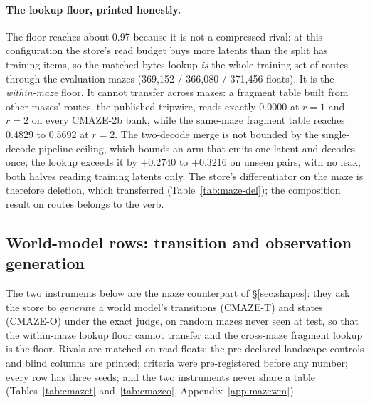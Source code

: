 \documentclass{article} %
\begin{document}
\paragraph{The lookup floor, printed honestly.} The floor reaches about 0.97 because it is not a
compressed rival: at this configuration the store's read budget buys more latents than the split
has training items, so the matched-bytes lookup \emph{is} the whole training set of routes
through the evaluation mazes (369,152 / 366,080 / 371,456 floats). %
It is the \emph{within-maze} floor. It cannot transfer across mazes: a fragment table built from
other mazes' routes, the published tripwire, reads exactly 0.0000 at $r=1$ and $r=2$ on every
CMAZE-2b bank, while the same-maze fragment table reaches 0.4829 to 0.5692 at $r=2$.
The two-decode merge is not bounded by the single-decode pipeline ceiling, which bounds an arm
that emits one latent and decodes once; the lookup exceeds it by $+0.2740$ to $+0.3216$ on
unseen pairs, with no leak, both halves reading training latents only.
The store's differentiator on the maze is therefore deletion, which transferred
(Table~\ref{tab:maze-del}); the composition result on routes belongs to the verb.

\subsection{World-model rows: transition and observation generation}
\label{sec:maze-wm}

The two instruments below are the maze counterpart of \S\ref{sec:shapes}: they ask the store to
\emph{generate} a world model's transitions (CMAZE-T) and states (CMAZE-O) under the exact judge,
on random mazes never seen at test, so that the within-maze lookup floor cannot transfer and the
cross-maze fragment lookup is the floor. Rivals are matched on read floats; the pre-declared
landscape controls and blind columns are printed; criteria were pre-registered before any number; every
row has three seeds; and the two instruments never share a table (Tables~\ref{tab:cmazet}
and~\ref{tab:cmazeo}, Appendix~\ref{app:mazewm}).

\end{document}
